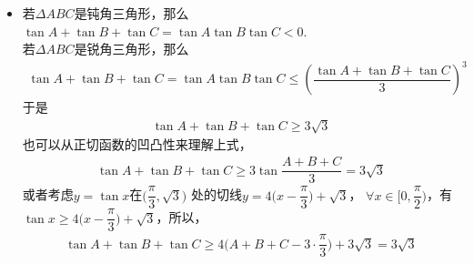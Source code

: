 \begin{itemize}[leftmargin=\inteval{\myitemleftmargin}pt,itemsep=
   \inteval{\myitemitempsep}pt,topsep=\inteval{\myitemtopsep}pt]
\item 若$ \Delta ABC $是钝角三角形，那么$ \tan A+\tan B +\tan C =
\tan A \tan B\tan C <0 $.\\
若$ \Delta ABC $是锐角三角形，那么
\begin{gather*}
    \tan A+\tan B +\tan C =\tan A \tan B\tan C \leq \left(
    \dfrac{\tan A+\tan B +\tan C}{3}\right)^3
\end{gather*}
于是
\begin{gather*}
    \tan A+\tan B +\tan C\geq 3\sqrt{3}
\end{gather*}
也可以从正切函数的凹凸性来理解上式，
\begin{gather*}
    \tan A+\tan B +\tan C\geq 3\tan\dfrac{A+B+C}{3}=3\sqrt{3}
\end{gather*}
或者考虑$ y=\tan x $在$ \Big(\dfrac{\pi}{3},\sqrt{3}\Big) $
处的切线$ y=4\Big(x-\dfrac{\pi}{3}\Big)+\sqrt{3} $，
$ \forall x\in \Big[0,\dfrac{\pi}{2}\Big) $，有$ \tan x\geq 
4\Big(x-\dfrac{\pi}{3}\Big)+\sqrt{3} $，所以，
\begin{gather*}
    \tan A +\tan B +\tan C \geq 4\Big(A+B+C-3\cdot\dfrac{\pi}{3}\Big)
    +3\sqrt{3}=3\sqrt{3}
\end{gather*}


\end{itemize}

